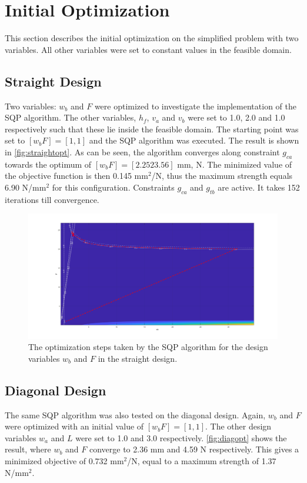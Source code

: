 \section{Initial Optimization}
This section describes the initial optimization on the simplified problem with two variables. All other variables were set to constant values in the feasible domain. 
\subsection{Straight Design}
Two variables: $w_b$ and $F$ were optimized to investigate the implementation of the SQP algorithm. The other variables, $h_f$, $v_a$ and $v_b$ were set to 1.0, 2.0 and 1.0 respectively such that these lie inside the feasible domain. The starting point was set to $[w_b F] = [1, 1]$ and the SQP algorithm was executed. The result is shown in \autoref{fig:straightopt}. As can be seen, the algorithm converges along constraint $g_{ca}$ towards the optimum of $[w_b F] = [2.25 23.56]$ mm, N. The minimized value of the objective function is then 0.145 mm$^2$/N, thus the maximum strength equals 6.90 N/mm$^2$ for this configuration. Constraints $g_{ca}$ and $g_{tb}$ are active. It takes 152 iterations till convergence.


\begin{figure}[H]
	\centering
	\includegraphics[width=\columnwidth]{sources/plots/straight2var.png}
	\caption{The optimization steps taken by the SQP algorithm for the design variables $w_b$ and $F$ in the straight design.}
	\label{fig:straightopt}
\end{figure}


\subsection{Diagonal Design}
The same SQP algorithm was also tested on the diagonal design. Again, $w_b$ and $F$ were optimized with an initial value of $[w_b F] = [1, 1]$. The other design variables $w_a$ and $L$ were set to 1.0 and 3.0 respectively. \autoref{fig:diagopt} shows the result, where $w_b$ and $F$ converge to 2.36 mm and 4.59 N respectively. This gives a minimized objective of 0.732 mm$^2$/N, equal to a maximum strength of 1.37 N/mm$^2$.


